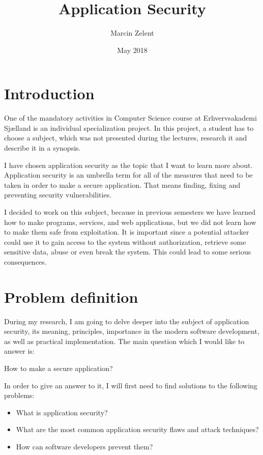 \documentclass[a4paper]{article}
\title{Application Security}
\author{Marcin Zelent}
\date{May 2018}
\begin{document}
\maketitle

\newpage

\tableofcontents

\newpage

\section{Introduction}

One of the mandatory activities in Computer Science course at Erhvervsakademi
Sjælland is an individual specialization project. In this project, a student has
to choose a subject, which was not presented during the lectures, research it
and describe it in a synopsis.

I have chosen application security as the topic that I want to learn more about.
Application security is an umbrella term for all of the measures that need to be
taken in order to make a secure application. That means finding, fixing and
preventing security vulnerabilities.

I decided to work on this subject, because in previous semesters we have learned
how to make programs, services, and web applications, but we did not learn how
to make them safe from exploitation. It is important since a potential attacker
could use it to gain access to the system without authorization, retrieve some
sensitive data, abuse or even break the system. This could lead to some serious
consequences.

\section{Problem definition}

During my research, I am going to delve deeper into the subject of application
security, its meaning, principles, importance in the modern software
development, as well as practical implementation.
The main question which I would like to answer is:

\medskip
{\large How to make a secure application?} 
\medskip

In order to give an answer to it, I will first need to find solutions to the
following problems:

\begin{itemize}
	\item What is application security?
	\item What are the most common application security flaws and attack
		techniques?
	\item How can software developers prevent them?
\end{itemize}
\end{document}
